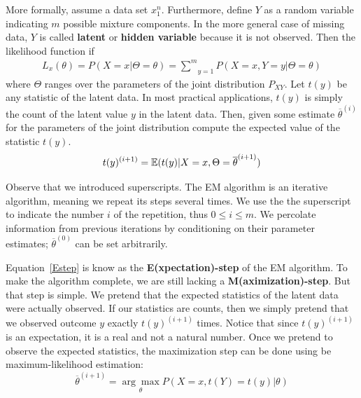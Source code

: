 More formally, assume a data set $ x_{1}^{n} $. Furthermore, define $ Y $ as a random variable indicating $ m $ possible
mixture components. In the more general case of missing data, $ Y $ is called \textbf{latent} or \textbf{hidden variable}
because it is not observed. Then the likelihood function if 
\begin{align}
L_{x}(\theta) = P(X=x|\Theta=\theta) = \underset{y=1}{\overset{m}{\sum}} P(X=x, Y=y|\Theta=\theta)
\end{align}
where $ \Theta $ ranges over the parameters of the joint distribution $ P_{XY} $. Let $ t(y) $ be any
statistic of the latent data. In most practical applications, $ t(y) $ is simply the count of the latent
value $ y $ in the latent data. Then, given some estimate $ \overline{\theta}^{(i)} $ for the parameters of the joint
distribution compute the expected value of the statistic $ t(y) $. 
\begin{equation} \label{Estep}
t(y)^{(i+1)} = \mathbb{E}(t(y)|X = x,\Theta = \overline{\theta}^{(i+1)})
\end{equation} 

Observe that we introduced superscripts. The EM algorithm is an iterative algorithm, meaning we repeat its steps several
times. We use the the superscript to indicate the number $i$ of the repetition, thus $ 0 \leq i \leq m $. We percolate 
information from previous iterations by conditioning on their parameter estimates; $ \overline{\theta}^{(0)} $ can be set arbitrarily.

Equation~\eqref{Estep} is know as the \textbf{E(xpectation)-step} of the EM algorithm. To make the algorithm complete, we are still lacking a
\textbf{M(aximization)-step}. But that step is simple. We pretend that the expected statistics of the latent data were actually observed. If
our statistics are counts, then we simply pretend that we observed outcome $ y $ exactly $ t(y)^{(i+1)} $ times. Notice that since $ t(y)^{(i+1)} $
is an expectation, it is a real and not a natural number. Once we pretend to observe the expected statistics, the maximization step can be done
using be maximum-likelihood estimation:
\begin{equation} \label{Mstep}
\overline{\theta}^{(i+1)} = \underset{\theta}{\arg\max} P(X=x, t(Y) = t(y)|\theta)
\end{equation}

